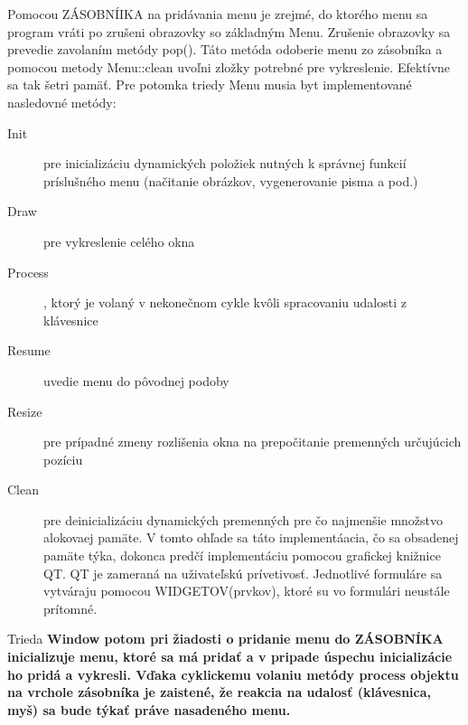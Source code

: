 Pomocou ZÁSOBNÍIKA na pridávania menu je zrejmé, do ktorého menu sa program vráti po zrušeni obrazovky so základným Menu. Zrušenie obrazovky sa prevedie zavolaním metódy pop(). Táto metóda odoberie menu zo zásobníka a pomocou metody Menu::clean uvoľni zložky potrebné pre vykreslenie. Efektívne sa tak šetri pamäť. Pre potomka triedy Menu musia byt implementované nasledovné metódy:
\begin{description}
\item [Init] pre inicializáciu dynamických položiek nutných k správnej funkcií príslušného menu (načitanie obrázkov, vygenerovanie pisma a pod.)
\item [Draw] pre vykreslenie celého okna
\item [Process], ktorý je volaný v nekonečnom cykle  kvôli spracovaniu udalosti z klávesnice
\item [Resume] uvedie menu do pôvodnej podoby
\item [Resize] pre prípadné zmeny rozlišenia okna na prepočitanie premenných určujúcich pozíciu
\item [Clean] pre deinicializáciu dynamických premenných pre čo najmenšie množstvo alokovaej pamäte. V tomto ohľade sa táto implementáacia, čo sa obsadenej pamäte týka, dokonca predčí implementáciu  pomocou grafickej knižnice QT. QT je zameraná na uživateľskú prívetivosť. Jednotlivé formuláre sa vytváraju pomocou WIDGETOV(prvkov), ktoré su vo formulári neustále prítomné. %
\end{description}
Trieda \bf{Window} potom pri žiadosti o pridanie menu do ZÁSOBNÍKA inicializuje menu, ktoré sa má pridať a v pripade úspechu inicializácie ho pridá a vykresli. Vďaka cyklickemu volaniu metódy process objektu na vrchole zásobníka je zaistené, že reakcia na udalosť (klávesnica, myš)  sa bude týkať práve nasadeného menu.   %
